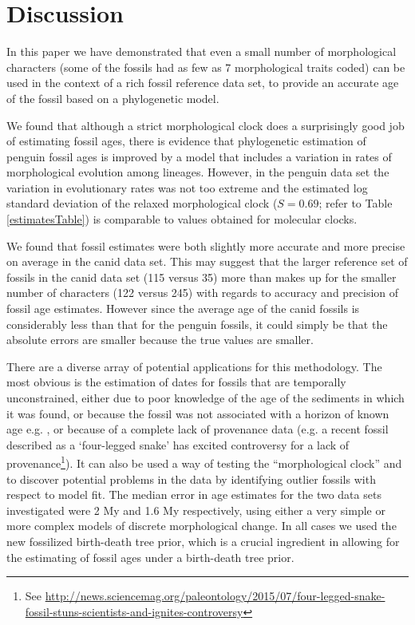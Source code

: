 \documentclass[11pt]{article}
\begin{document}
\section*{Discussion}

In this paper we have demonstrated that even a small number of morphological characters (some of the fossils had as few as 7 morphological traits coded) can be used in the context of a rich fossil reference data set, to provide an accurate age of the fossil based on a phylogenetic model. 

We found that although a strict morphological clock does a surprisingly good job of estimating fossil ages, there is evidence that phylogenetic estimation of penguin fossil ages is improved by a model that includes a variation in rates of morphological evolution among lineages. 
However, in the penguin data set the variation in evolutionary rates was not too extreme and the estimated log standard deviation of the relaxed morphological clock ($S = 0.69$; refer to Table \ref{estimatesTable}) is comparable to values obtained for molecular clocks.   

We found that fossil estimates were both slightly more accurate and more precise on average in the canid data set. 
This may suggest that the larger reference set of fossils in the canid data set (115 versus 35) more than makes up for the smaller number of characters (122 versus 245) with regards to accuracy and precision of fossil age estimates. However since the average age of the canid fossils is considerably less than that for the penguin fossils, it could simply be that the absolute errors are smaller because the true values are smaller.

There are a diverse array of potential applications for this methodology. 
The most obvious is the estimation of dates for fossils that are temporally unconstrained, either due to poor knowledge of the age of the sediments in which it was found, 
or because the fossil was not associated with a horizon of known age e.g. \cite{Berger2015},
or because of a complete lack of provenance data (e.g. a recent fossil described as a `four-legged snake' has excited controversy for a lack of provenance\footnote{See \url{http://news.sciencemag.org/paleontology/2015/07/four-legged-snake-fossil-stuns-scientists-and-ignites-controversy}}). 
It can also be used a way of testing the ``morphological clock'' and to discover potential problems in the data by identifying outlier fossils with respect to model fit. 
The median error in age estimates for the two data sets investigated were 2 My and 1.6 My respectively, using either a very simple or more complex models of discrete morphological change. 
In all cases we used the new fossilized birth-death tree prior, which is a crucial ingredient in allowing for the estimating of fossil ages under a birth-death tree prior. 
\end{document}
